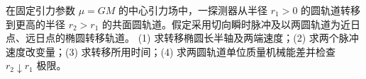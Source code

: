 在固定引力参数 \(\mu=GM\) 的中心引力场中，一探测器从半径 \(r_1>0\) 的圆轨道转移到更高的半径 \(r_2>r_1\) 的共面圆轨道。假定采用切向瞬时脉冲及以两圆轨道为近日点、远日点的椭圆转移轨道。
(1) 求转移椭圆长半轴及两端速度；(2) 求两个脉冲速度改变量；(3) 求转移所用时间；(4) 求两圆轨道单位质量机械能差并检查 \(r_2\downarrow r_1\) 极限。
